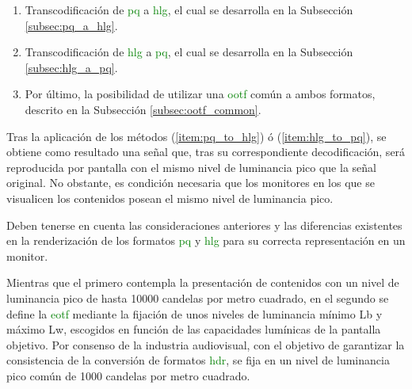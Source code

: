 \documentclass[a4paper, 12pt]{report}
\begin{document}
\begin{enumerate}
    \setlength\itemsep{-0.5em}
    \item Transcodificación de \textcolor{green}{pq} a \textcolor{green}{hlg}, el cual se desarrolla en la Subsección                     \ref{subsec:pq_a_hlg}.\label{item:pq_to_hlg}
    \item Transcodificación de \textcolor{green}{hlg} a \textcolor{green}{pq}, el cual se desarrolla en la Subsección                     \ref{subsec:hlg_a_pq}.\label{item:hlg_to_pq}
    \item Por último, la posibilidad de utilizar una \textcolor{green}{ootf} común a ambos formatos,
          descrito en la Subsección \ref{subsec:ootf_common}.\label{item:common_ootf}
\end{enumerate}


 

Tras la aplicación de los métodos (\ref{item:pq_to_hlg}) ó (\ref{item:hlg_to_pq}), se obtiene como resultado una señal que, tras su correspondiente decodificación, será reproducida por pantalla con el mismo nivel de luminancia pico que la señal original. No obstante, es condición necesaria que los monitores en los que se visualicen los contenidos posean el mismo nivel de luminancia pico.
 
Deben tenerse en cuenta las consideraciones anteriores y las diferencias existentes en la renderización de los formatos \textcolor{green}{pq} y \textcolor{green}{hlg} para su correcta representación en un monitor.
 
Mientras que el primero contempla la presentación de contenidos con un nivel de luminancia pico de hasta 10000 candelas por metro cuadrado, en el segundo se define la \textcolor{green}{eotf} mediante la  fijación  de  unos niveles de luminancia mínimo Lb y máximo Lw, escogidos  en función de las capacidades lumínicas de la pantalla objetivo. Por consenso de la industria audiovisual, con el objetivo de garantizar la consistencia de la conversión de formatos \textcolor{green}{hdr}, se fija en un nivel de luminancia pico común de  
1000 candelas por metro cuadrado.
\end{document}
